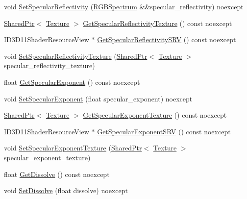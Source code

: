 \begin{DoxyCompactItemize}
void \hyperlink{structmage_1_1_shaded_material_acfe55ee6398b1255d48d7e72a543f127}{Set\+Specular\+Reflectivity} (\hyperlink{structmage_1_1_r_g_b_spectrum}{R\+G\+B\+Spectrum} \&\&specular\+\_\+reflectivity) noexcept
\item 
\hyperlink{namespacemage_a1e01ae66713838a7a67d30e44c67703e}{Shared\+Ptr}$<$ \hyperlink{classmage_1_1_texture}{Texture} $>$ \hyperlink{structmage_1_1_shaded_material_aabf7fea125dfdf4d97537f22e0003a9e}{Get\+Specular\+Reflectivity\+Texture} () const noexcept
\item 
I\+D3\+D11\+Shader\+Resource\+View $\ast$ \hyperlink{structmage_1_1_shaded_material_a5ea5b4ad3100a2a625b2849ba142cdd6}{Get\+Specular\+Reflectivity\+S\+RV} () const noexcept
\item 
void \hyperlink{structmage_1_1_shaded_material_a8bd9bf0a0b1f636a74d3452c58b5b98d}{Set\+Specular\+Reflectivity\+Texture} (\hyperlink{namespacemage_a1e01ae66713838a7a67d30e44c67703e}{Shared\+Ptr}$<$ \hyperlink{classmage_1_1_texture}{Texture} $>$ specular\+\_\+reflectivity\+\_\+texture)
\item 
float \hyperlink{structmage_1_1_shaded_material_adb859615bf3461e9554e91550860d588}{Get\+Specular\+Exponent} () const noexcept
\item 
void \hyperlink{structmage_1_1_shaded_material_ae9c4286f2802a30698863c9abe95e60d}{Set\+Specular\+Exponent} (float specular\+\_\+exponent) noexcept
\item 
\hyperlink{namespacemage_a1e01ae66713838a7a67d30e44c67703e}{Shared\+Ptr}$<$ \hyperlink{classmage_1_1_texture}{Texture} $>$ \hyperlink{structmage_1_1_shaded_material_a0d1d76e70949caf33e30aa474882b364}{Get\+Specular\+Exponent\+Texture} () const noexcept
\item 
I\+D3\+D11\+Shader\+Resource\+View $\ast$ \hyperlink{structmage_1_1_shaded_material_abae39d873aab545a59d1b611cf9b2025}{Get\+Specular\+Exponent\+S\+RV} () const noexcept
\item 
void \hyperlink{structmage_1_1_shaded_material_a5ef7c32a67a49814a448667779cfcb4b}{Set\+Specular\+Exponent\+Texture} (\hyperlink{namespacemage_a1e01ae66713838a7a67d30e44c67703e}{Shared\+Ptr}$<$ \hyperlink{classmage_1_1_texture}{Texture} $>$ specular\+\_\+exponent\+\_\+texture)
\item 
float \hyperlink{structmage_1_1_shaded_material_adff98fa9d3ace697033106e04d09ac98}{Get\+Dissolve} () const noexcept
\item 
void \hyperlink{structmage_1_1_shaded_material_a403f3e4e673d31fffdb387f518393453}{Set\+Dissolve} (float dissolve) noexcept

\end{DoxyCompactItemize}
